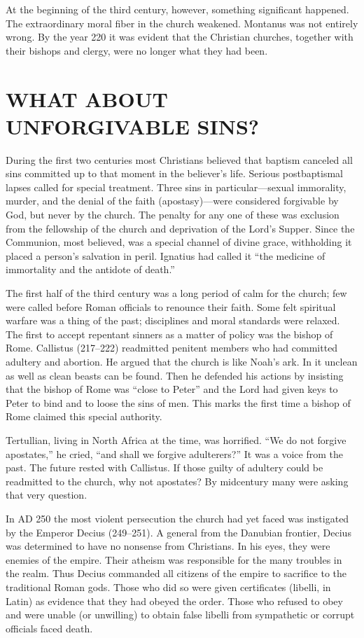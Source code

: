 At the beginning of the third century, however, something significant happened. The extraordinary
moral fiber in the church weakened. Montanus was not entirely wrong. By the year 220 it was evident
that the Christian churches, together with their bishops and clergy, were no longer what they had
been.

\section{WHAT ABOUT UNFORGIVABLE SINS?}

During the first two centuries most Christians believed that baptism canceled all sins committed up
to that moment in the believer’s life. Serious postbaptismal lapses called for special treatment.
Three sins in particular—sexual immorality, murder, and the denial of the faith (apostasy)—were
considered forgivable by God, but never by the church. The penalty for any one of these was
exclusion from the fellowship of the church and deprivation of the Lord’s Supper. Since the
Communion, most believed, was a special channel of divine grace, withholding it placed a person’s
salvation in peril. Ignatius had called it “the medicine of immortality and the antidote of death.”

The first half of the third century was a long period of calm for the church; few were called before
Roman officials to renounce their faith. Some felt spiritual warfare was a thing of the past;
disciplines and moral standards were relaxed. The first to accept repentant sinners as a matter of
policy was the bishop of Rome. Callistus (217–222) readmitted penitent members who had committed
adultery and abortion. He argued that the church is like Noah’s ark. In it unclean as well as clean
beasts can be found. Then he defended his actions by insisting that the bishop of Rome was “close to
Peter” and the Lord had given keys to Peter to bind and to loose the sins of men. This marks the
first time a bishop of Rome claimed this special authority.

Tertullian, living in North Africa at the time, was horrified. “We do not forgive apostates,” he
cried, “and shall we forgive adulterers?” It was a voice from the past. The future rested with
Callistus. If those guilty of adultery could be readmitted to the church, why not apostates? By
midcentury many were asking that very question.

In AD 250 the most violent persecution the church had yet faced was instigated by the Emperor Decius
(249–251). A general from the Danubian frontier, Decius was determined to have no nonsense from
Christians. In his eyes, they were enemies of the empire. Their atheism was responsible for the many
troubles in the realm. Thus Decius commanded all citizens of the empire to sacrifice to the
traditional Roman gods. Those who did so were given certificates (libelli, in Latin) as evidence
that they had obeyed the order. Those who refused to obey and were unable (or unwilling) to obtain
false libelli from sympathetic or corrupt officials faced death.

